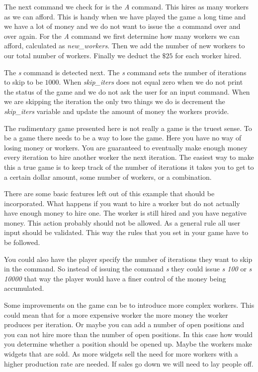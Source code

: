 The next command we check for is the \emph{A} command. This hires as many workers as we can afford. This is handy when we have played the game a long time and we have a lot of money and we do not want to issue the \emph{a} command over and over again. For the \emph{A} command we first determine how many workers we can afford, calculated as \emph{new\_workers}. Then we add the number of new workers to our total number of workers. Finally we deduct the $\$25$ for each worker hired. 

The \emph{s} command is detected next. The \emph{s} command sets the number of iterations to skip to be $1000$. When \emph{skip\_iters} does not equal zero when we do not print the status of the game and we do not ask the user for an input command. When we are skipping the iteration the only two things we do is decrement the \emph{skip\_iters} variable and update the amount of money the workers provide. 



The rudimentary game presented here is not really a game is the truest sense. To be a game there needs to be a way to lose the game. Here you have no way of losing money or workers. You are guaranteed to eventually make enough money every iteration to hire another worker the next iteration. The easiest way to make this a true game is to keep track of the number of iterations it takes you to get to a certain dollar amount, some number of workers, or a combination. 

There are some basic features left out of this example that should be incorporated. What happens if you want to hire a worker but do not actually have enough money to hire one. The worker is still hired and you have negative money. This action probably should not be allowed. As a general rule all user input should be validated. This way the rules that you set in your game have to be followed. 

You could also have the player specify the number of iterations they want to skip in the command. So instead of issuing the command \emph{s} they could issue \emph{s 100} or \emph{s 10000} that way the player would have a finer control of the money being accumulated. 

Some improvements on the game can be to introduce more complex workers. This could mean that for a more expensive worker the more money the worker produces per iteration. Or maybe you can add a number of open positions and you can not hire more than the number of open positions. In this case how would you determine whether a position should be opened up. Maybe the workers make widgets that are sold. As more widgets sell the need for more workers with a higher production rate are needed. If sales go down we will need to lay people off. 

